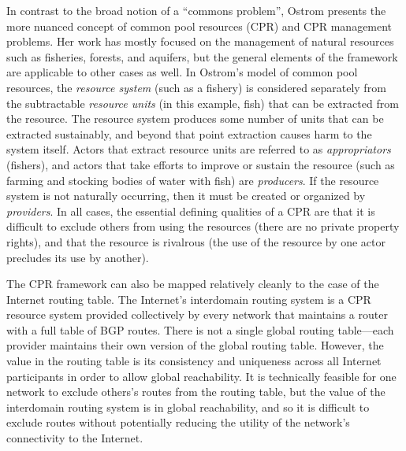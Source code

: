 In contrast to the broad notion of a ``commons problem'', Ostrom \cite{Ostrom:1990fv} presents the more nuanced concept of common pool resources (CPR) and CPR management problems. Her work has mostly focused on the management of natural resources such as fisheries, forests, and aquifers, but the general elements of the framework are applicable to other cases as well. In Ostrom's model of common pool resources, the \emph{resource system} (such as a fishery) is considered separately from the subtractable \emph{resource units} (in this example, fish) that can be extracted from the resource. The resource system produces some number of units that can be extracted sustainably, and beyond that point extraction causes harm to the system itself. Actors that extract resource units are referred to as \emph{appropriators} (fishers), and actors that take efforts to improve or sustain the resource (such as farming and stocking bodies of water with fish) are \emph{producers}. If the resource system is not naturally occurring, then it must be created or organized by \emph{providers}. In all cases, the essential defining qualities of a CPR are that it is difficult to exclude others from using the resources (there are no private property rights), and that the resource is rivalrous (the use of the resource by one actor precludes its use by another).

The CPR framework can also be mapped relatively cleanly to the case of the Internet routing table. The Internet's interdomain routing system is a CPR resource system provided collectively by every network that maintains a router with a full table of BGP routes. 
There is not a single global routing table---each provider maintains their own version of the global routing table. However, the value in the routing table is its consistency and uniqueness across all Internet participants in order to allow global reachability. It is technically feasible for one network to exclude others's routes from the routing table, but the value of the interdomain routing system is in global reachability, and so it is difficult to exclude routes without potentially reducing the utility of the network's connectivity to the Internet. 

